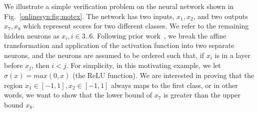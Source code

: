 We illustrate a simple verification problem on the neural network shown in
Fig.~\ref{onlinesyn:fig:motex}. The network has two inputs, $ x_1, x_2 $, and two
outputs
$ x_7, x_8 $ which represent scores for two different classes. We refer to the
remaining hidden neurons as $ x_i, i \in {3..6} $. Following prior
work~\cite{SinghGPV19}, we break the affine transformation and application of
the activation function into two separate neurons, and the neurons are assumed
to be ordered such that, if $ x_i $ is in a layer before $ x_j $, then $ i < j
$.
For simplicity, in this motivating example, we let $ \sigma(x) = max(0, x) $ (the ReLU function).
We are interested in proving that the region $ x_1 \in [-1, 1], x_2 \in [-1 ,1]
$ always maps to the first class, or in other words, we want to show that the
lower bound of $ x_7 $ is greater than the upper bound $ x_8 $.

